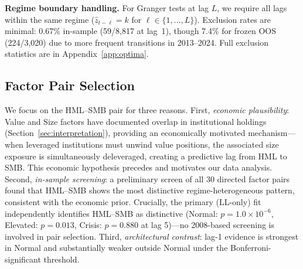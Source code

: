 \documentclass[sigconf,anonymous]{acmart}
\begin{document}
\textbf{Regime boundary handling.} For Granger tests at lag $L$,
we require all lags within the same regime ($\hat{z}_{t-\ell} = k$ for
$\ell \in \{1, \ldots, L\}$). Exclusion rates are minimal: 0.67\%
in-sample (59/8,817 at lag~1), though 7.4\% for frozen OOS (224/3,020)
due to more frequent transitions in 2013--2024. Full exclusion statistics
are in Appendix~\ref{app:optima}.

\subsection{Factor Pair Selection}
\label{sec:pairselection}

We focus on the HML--SMB pair for three reasons. First, \emph{economic
plausibility}: Value and Size factors have documented overlap in institutional
holdings (Section~\ref{sec:interpretation}), providing an economically motivated
mechanism---when leveraged institutions must unwind value positions, the associated
size exposure is simultaneously deleveraged, creating a predictive lag from HML
to SMB. This economic hypothesis precedes and motivates our data analysis.
Second, \emph{in-sample screening}: a preliminary screen of all 30 directed
factor pairs found that HML--SMB shows the most distinctive regime-heterogeneous
pattern, consistent with the economic prior. Crucially, the primary (LL-only) fit
independently identifies HML--SMB as distinctive (Normal: $p = 1.0 \times 10^{-6}$,
Elevated: $p = 0.013$, Crisis: $p = 0.880$ at lag 5)---no 2008-based screening is
involved in pair selection.
Third, \emph{architectural contrast}: lag-1 evidence is strongest in Normal and
substantially weaker outside Normal under the Bonferroni-significant threshold.
\end{document}
